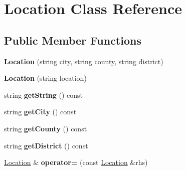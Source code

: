 \hypertarget{class_location}{}\section{Location Class Reference}
\label{class_location}
\subsection*{Public Member Functions}
\begin{DoxyCompactItemize}
\item 
\hypertarget{class_location_adde1be165887d4738c25164191107f8a}{}{\bfseries Location} (string city, string county, string district)\label{class_location_adde1be165887d4738c25164191107f8a}

\item 
\hypertarget{class_location_aa41373bb46efc066f79ab697c56b0da3}{}{\bfseries Location} (string location)\label{class_location_aa41373bb46efc066f79ab697c56b0da3}

\item 
\hypertarget{class_location_a9584236ecf93acc9192ece00583482ab}{}string {\bfseries get\+String} () const \label{class_location_a9584236ecf93acc9192ece00583482ab}

\item 
\hypertarget{class_location_ac682ee57f401c50a88d362305d159640}{}string {\bfseries get\+City} () const \label{class_location_ac682ee57f401c50a88d362305d159640}

\item 
\hypertarget{class_location_aa200afd4afd7898f16c5e54c533da4ef}{}string {\bfseries get\+County} () const \label{class_location_aa200afd4afd7898f16c5e54c533da4ef}

\item 
\hypertarget{class_location_a989ce807f112210952bad662d38185dd}{}string {\bfseries get\+District} () const \label{class_location_a989ce807f112210952bad662d38185dd}

\item 
\hypertarget{class_location_a41a15b0cfd590d365e31f613d32eebd1}{}\hyperlink{class_location}{Location} \& {\bfseries operator=} (const \hyperlink{class_location}{Location} \&rhs)\label{class_location_a41a15b0cfd590d365e31f613d32eebd1}

\end{DoxyCompactItemize}
